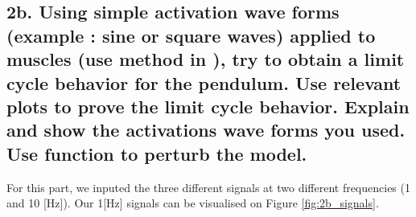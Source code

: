 \documentclass{cmc}
\begin{document}
\subsection*{2b. Using simple activation wave forms (example : sine or
  square waves) applied to muscles (use
   method in
  ), try to obtain a limit cycle behavior for
  the pendulum. Use relevant plots to prove the limit cycle behavior.
  Explain and show the activations wave forms you used. Use
  function to perturb the model.}
\label{sec:2b}


For this part, we inputed the three different signals at two different frequencies (1 and 10 [Hz]). Our 1[Hz] signals can be visualised on Figure \ref{fig:2b_signals}.
\end{document}
